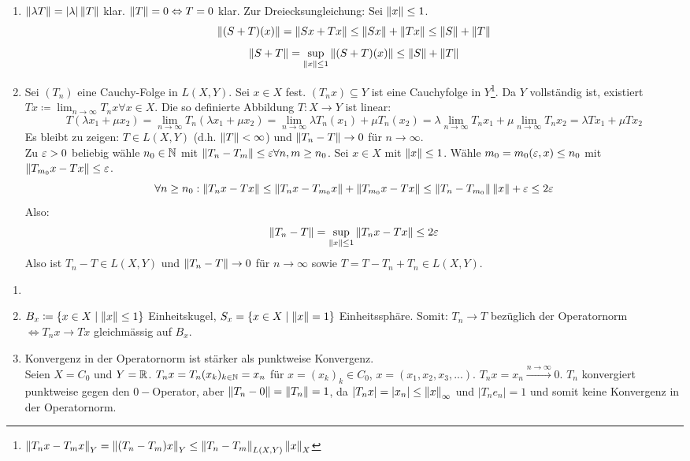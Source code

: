 \begin{beweis}
	\begin{enumerate}
		\item $ \left\|\lambda T\right\|=|\lambda|\left\|T\right\| $ klar. $ \left\|T\right\|=0\Leftrightarrow T=0 $ klar. Zur Dreiecksungleichung: Sei $ \left\|x\right\|\leq 1 $.
		\[ \left\|(S+T)(x)\right\|=\left\|Sx+Tx\right\|\leq\left\|Sx\right\|+\left\|Tx\right\|\leq\left\|S\right\|+\left\|T\right\| \]
		\[ \left\|S+T\right\|=\sup_{\left\|x\right\|\leq 1}\left\|(S+T)(x)\right\|\leq\left\|S\right\|+\left\|T\right\| \]
		\item Sei $ (T_n) $ eine Cauchy-Folge in $ L(X,Y) $. Sei $ x\in X $ fest. $ (T_nx)\subseteq Y $ ist eine Cauchyfolge in $ Y $\footnote{$ \left\|T_nx-T_mx\right\|_Y=\left\|(T_n-T_m)x\right\|_Y\leq\left\|T_n-T_m\right\|_{L(X,Y)}\left\|x\right\|_X $}. Da $ Y $ vollst\"andig ist, existiert $ Tx\coloneqq\lim_{n\to\infty}T_nx\forall x\in X $. Die so definierte Abbildung $ T\colon X\rightarrow Y $ ist linear:
		\[ T(\lambda x_1+\mu x_2)=\lim_{n\to\infty}T_n(\lambda x_1+\mu x_2)=\lim_{n\to\infty}\lambda T_n(x_1)+\mu T_n(x_2)=\lambda\lim_{n\to\infty}T_nx_1+\mu\lim_{n\to\infty}T_nx_2=\lambda Tx_1+\mu Tx_2 \]
		Es bleibt zu zeigen: $ T\in L(X,Y) $  (d.h. $ \left\|T\right\|<\infty $) und $ \left\|T_n-T\right\|\rightarrow 0 $ f\"ur $ n\rightarrow\infty $.\\
		Zu $ \varepsilon>0 $ beliebig wähle $ n_0\in\mathbb{N} $ mit $ \left\|T_n-T_m\right\|\leq\varepsilon\forall n,m\geq n_0 $. Sei $ x\in X $ mit $ \left\|x\right\|\leq 1 $. W\"ahle $ m_0=m_0(\varepsilon,x)\leq n_0 $ mit $ \left\|T_{m_0}x-Tx\right\|\leq\varepsilon $.
		\[ \forall n\geq n_0:\left\|T_nx-Tx\right\|\leq\left\|T_nx-T_{m_0}x\right\|+\left\|T_{m_0}x-Tx\right\|\leq\left\|T_n-T_{m_0}\right\|\left\|x\right\|+\varepsilon\leq 2\varepsilon \]
		Also: \[ \left\|T_n-T\right\|=\sup_{\left\|x\right\|\leq 1}\left\|T_nx-Tx\right\|\leq 2\varepsilon \]
		Also ist $ T_n-T\in L(X,Y) $ und $ \left\|T_n-T\right\|\rightarrow 0$ f\"ur $ n\rightarrow\infty $ sowie $ T=T-T_n+T_n\in L(X,Y) $. 
	\end{enumerate}\vspace{-22pt}
\end{beweis}
\begin{bemerkung*}
	\begin{enumerate}
		\item[]
		\item $ B_x\coloneqq\lbrace x\in X\mid\left\|x\right\|\leq 1\rbrace $ Einheitskugel, $ S_x=\lbrace x\in X\mid\left\|x\right\|=1\rbrace $ Einheitssph\"are. Somit: $ T_n\rightarrow T $ bez\"uglich der Operatornorm$ \Leftrightarrow T_nx\rightarrow Tx $ gleichm\"assig auf $ B_x $.
		\item Konvergenz in der Operatornorm ist st\"arker als punktweise Konvergenz.\\
		Seien $ X=C_0 $ und $ Y=\mathbb{R} $. $ T_nx=T_n(x_k)_{k\in\mathbb{N}} =x_n$ f\"ur $ x=(x_k)_k\in C_0 $, $ x=(x_1,x_2,x_3,...) $. $ T_nx=x_n\xrightarrow{n\to\infty} 0 $. $ T_n $ konvergiert punktweise gegen den $ 0- $Operator, aber $ \left\|T_n-0\right\|=\left\|T_n\right\|=1 $, da $ |T_nx|=|x_n|\leq\left\|x\right\|_\infty $ und $ |T_ne_n|=1 $ und somit keine Konvergenz in der Operatornorm.
	\end{enumerate}
\end{bemerkung*}
